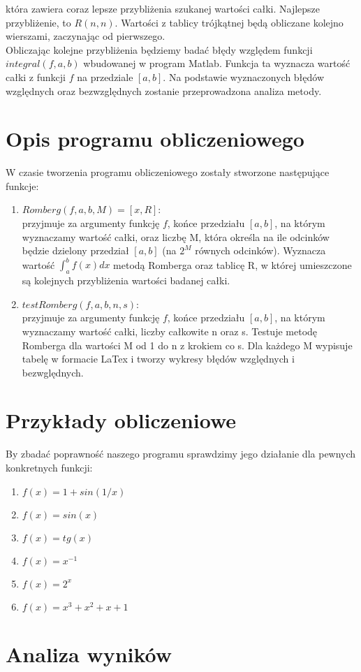 \documentclass[12pt]{article}
\begin{document}
kt\'ora zawiera coraz lepsze przybli\.zenia szukanej warto\'sci ca\l{}ki. Najlepsze przybli\.zenie, to $R(n,n)$. Warto\'sci z tablicy tr\'ojk\k{a}tnej b\k{e}d\k{a} obliczane kolejno wierszami, zaczynaj\k{a}c od pierwszego.
\\
Obliczaj\k{a}c kolejne przybli\.zenia b\k{e}dziemy bada\'c b\l{}\k{e}dy wzgl\k{e}dem funkcji $integral(f,a,b)$ wbudowanej w program Matlab. Funkcja ta wyznacza warto\'s\'c ca\l{}ki z funkcji $f$ na przedziale $[a,b]$. Na podstawie wyznaczonych b\l{}\k{e}d\'ow wzgl\k{e}dnych oraz bezwzgl\k{e}dnych zostanie przeprowadzona analiza metody. 
\\
\vskip20pt

\section{Opis programu obliczeniowego}

W czasie tworzenia programu obliczeniowego zosta\l{}y stworzone nast\k{e}puj\k{a}ce funkcje:
\begin{enumerate}
\item $Romberg(f,a,b,M)=[x,R]$:
\\
przyjmuje za argumenty funkcj\k{e} $f$, ko\'nce przedzia\l{}u $[a,b]$, na kt\'orym wyznaczamy warto\'s\'c ca\l{}ki, oraz liczb\k{e} M, kt\'ora okre\'sla na ile odcink\'ow b\k{e}dzie dzielony przedzia\l{} $[a,b]$ (na $2^M$ r\'ownych odcink\'ow). Wyznacza warto\'s\'c $\int_{a}^{b}f\left( x\right)dx$ metod\k{a} Romberga oraz tablic\k{e} R, w kt\'orej umieszczone s\k{a} kolejnych przybli\.zenia warto\'sci badanej ca\l{}ki.

\item $testRomberg(f,a,b,n,s)$:
\\
przyjmuje za argumenty funkcj\k{e} $f$, ko\'nce przedzia\l{}u $[a,b]$, na kt\'orym wyznaczamy warto\'s\'c ca\l{}ki, liczby ca\l{}kowite n oraz s. Testuje metod\k{e} Romberga dla warto\'sci M od 1 do n z krokiem co s. Dla ka\.zdego M wypisuje tabel\k{e} w formacie LaTex i tworzy wykresy b\l{}\k{e}d\'ow wzgl\k{e}dnych i bezwgl\k{e}dnych. 
 
\end{enumerate}

\vskip20pt

\section{Przyk\l ady obliczeniowe}

\noindent 
By zbada\'c poprawno\'s\'c naszego programu sprawdzimy jego dzia\l{}anie dla pewnych konkretnych funkcji:
\begin{enumerate}
\item $f(x)=1+sin(1/x)$
\item $f(x)=sin(x)$
\item $f(x)=tg(x)$
\item $f(x)=x^{-1}$
\item $f(x)=2^x$
\item $f(x)=x^3+x^2+x+1$

\end{enumerate}

\vskip20pt

\section{Analiza wynik\'ow}
\end{document}
